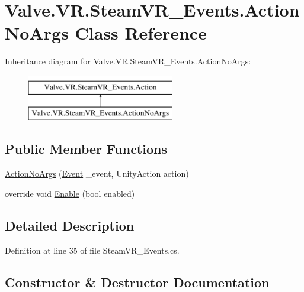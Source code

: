 \hypertarget{class_valve_1_1_v_r_1_1_steam_v_r___events_1_1_action_no_args}{}\section{Valve.\+V\+R.\+Steam\+V\+R\+\_\+\+Events.\+Action\+No\+Args Class Reference}
\label{class_valve_1_1_v_r_1_1_steam_v_r___events_1_1_action_no_args}
Inheritance diagram for Valve.\+V\+R.\+Steam\+V\+R\+\_\+\+Events.\+Action\+No\+Args\+:\begin{figure}[H]
\begin{center}
\leavevmode
\includegraphics[height=2.000000cm]{class_valve_1_1_v_r_1_1_steam_v_r___events_1_1_action_no_args}
\end{center}
\end{figure}
\subsection*{Public Member Functions}
\begin{DoxyCompactItemize}
\item 
\mbox{\hyperlink{class_valve_1_1_v_r_1_1_steam_v_r___events_1_1_action_no_args_a523295b564844b3a8f3f0389f8f1a281}{Action\+No\+Args}} (\mbox{\hyperlink{class_valve_1_1_v_r_1_1_steam_v_r___events_1_1_event}{Event}} \+\_\+event, Unity\+Action action)
\item 
override void \mbox{\hyperlink{class_valve_1_1_v_r_1_1_steam_v_r___events_1_1_action_no_args_a2e2ea6edeefdd43950cbeb6fd2313441}{Enable}} (bool enabled)
\end{DoxyCompactItemize}


\subsection{Detailed Description}


Definition at line 35 of file Steam\+V\+R\+\_\+\+Events.\+cs.



\subsection{Constructor \& Destructor Documentation}
\mbox{\label{class_valve_1_1_v_r_1_1_steam_v_r___events_1_1_action_no_args_a523295b564844b3a8f3f0389f8f1a281}} 
